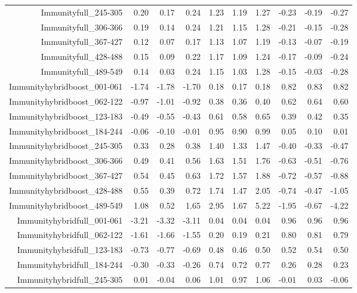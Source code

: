 \begin{table}[ht]
\begin{tabular}{rrrrrrrrrr}
  Immunityfull\_245-305 & 0.20 & 0.17 & 0.24 & 1.23 & 1.19 & 1.27 & -0.23 & -0.19 & -0.27 \\ 
  Immunityfull\_306-366 & 0.19 & 0.14 & 0.24 & 1.21 & 1.15 & 1.28 & -0.21 & -0.15 & -0.28 \\ 
  Immunityfull\_367-427 & 0.12 & 0.07 & 0.17 & 1.13 & 1.07 & 1.19 & -0.13 & -0.07 & -0.19 \\ 
  Immunityfull\_428-488 & 0.15 & 0.09 & 0.22 & 1.17 & 1.09 & 1.24 & -0.17 & -0.09 & -0.24 \\ 
  Immunityfull\_489-549 & 0.14 & 0.03 & 0.24 & 1.15 & 1.03 & 1.28 & -0.15 & -0.03 & -0.28 \\ 
  Immunityhybridboost\_001-061 & -1.74 & -1.78 & -1.70 & 0.18 & 0.17 & 0.18 & 0.82 & 0.83 & 0.82 \\ 
  Immunityhybridboost\_062-122 & -0.97 & -1.01 & -0.92 & 0.38 & 0.36 & 0.40 & 0.62 & 0.64 & 0.60 \\ 
  Immunityhybridboost\_123-183 & -0.49 & -0.55 & -0.43 & 0.61 & 0.58 & 0.65 & 0.39 & 0.42 & 0.35 \\ 
  Immunityhybridboost\_184-244 & -0.06 & -0.10 & -0.01 & 0.95 & 0.90 & 0.99 & 0.05 & 0.10 & 0.01 \\ 
  Immunityhybridboost\_245-305 & 0.33 & 0.28 & 0.38 & 1.40 & 1.33 & 1.47 & -0.40 & -0.33 & -0.47 \\ 
  Immunityhybridboost\_306-366 & 0.49 & 0.41 & 0.56 & 1.63 & 1.51 & 1.76 & -0.63 & -0.51 & -0.76 \\ 
  Immunityhybridboost\_367-427 & 0.54 & 0.45 & 0.63 & 1.72 & 1.57 & 1.88 & -0.72 & -0.57 & -0.88 \\ 
  Immunityhybridboost\_428-488 & 0.55 & 0.39 & 0.72 & 1.74 & 1.47 & 2.05 & -0.74 & -0.47 & -1.05 \\ 
  Immunityhybridboost\_489-549 & 1.08 & 0.52 & 1.65 & 2.95 & 1.67 & 5.22 & -1.95 & -0.67 & -4.22 \\ 
  Immunityhybridfull\_001-061 & -3.21 & -3.32 & -3.11 & 0.04 & 0.04 & 0.04 & 0.96 & 0.96 & 0.96 \\ 
  Immunityhybridfull\_062-122 & -1.61 & -1.66 & -1.55 & 0.20 & 0.19 & 0.21 & 0.80 & 0.81 & 0.79 \\ 
  Immunityhybridfull\_123-183 & -0.73 & -0.77 & -0.69 & 0.48 & 0.46 & 0.50 & 0.52 & 0.54 & 0.50 \\ 
  Immunityhybridfull\_184-244 & -0.30 & -0.33 & -0.26 & 0.74 & 0.72 & 0.77 & 0.26 & 0.28 & 0.23 \\ 
  Immunityhybridfull\_245-305 & 0.01 & -0.04 & 0.06 & 1.01 & 0.97 & 1.06 & -0.01 & 0.03 & -0.06 \\ 

\end{tabular}
\end{table}
